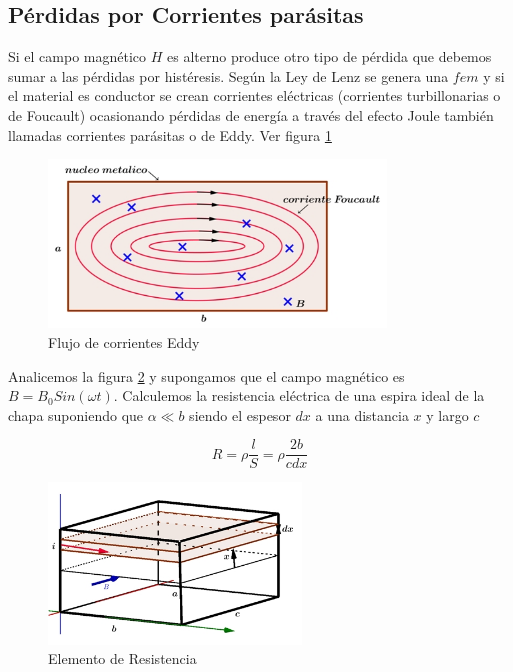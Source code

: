 \subsection{Pérdidas por Corrientes parásitas}

Si el campo magnético $H$ es alterno produce otro tipo de pérdida que debemos sumar a las pérdidas por histéresis. Según la Ley de Lenz se genera una $fem$ y si el material es conductor se crean corrientes eléctricas (corrientes turbillonarias o de Foucault) ocasionando pérdidas de energía a través del efecto Joule también llamadas corrientes parásitas o de Eddy. Ver figura \ref{fig:corrientesParasitas2}

\begin{figure}[H]
    \centering
    \includegraphics[width=0.8\textwidth]{./Figures/corrientesParasitas2}
	\caption{Flujo de corrientes Eddy }
	\label{fig:corrientesParasitas2}
\end{figure}

Analicemos la figura \ref{fig:corrientesParasitas1} y supongamos que el campo magnético es ${B = B_{0} Sin(\omega t)}$. Calculemos la resistencia eléctrica de una espira ideal de la chapa suponiendo que $\alpha\ll b$ siendo el espesor $dx$ a una distancia $x$ y largo $c$

\begin{equation}
R = \rho \frac{l}{S} = \rho \frac{2 b}{c dx}
\end{equation}

\begin{figure}[H]
    \centering
    \includegraphics[width=0.6\textwidth]{./Figures/corrientesParasitas1}
	\caption{Elemento de Resistencia}
	\label{fig:corrientesParasitas1}
\end{figure}

